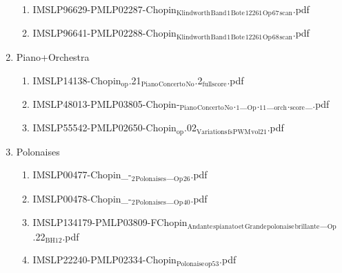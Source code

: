 \documentclass[11pt]{article}
\begin{document}
\begin{enumerate}
\begin{enumerate}
\item IMSLP96629-PMLP02287-Chopin$_{\text{Klindworth}}$$_{\text{Band}}$$_{\text{1}}$$_{\text{Bote}}$$_{\text{12261}}$$_{\text{Op}}$$_{\text{67}}$$_{\text{scan}}$.pdf
\label{sec-1-1-1-1-44-21-3-15}

\item IMSLP96641-PMLP02288-Chopin$_{\text{Klindworth}}$$_{\text{Band}}$$_{\text{1}}$$_{\text{Bote}}$$_{\text{12261}}$$_{\text{Op}}$$_{\text{68}}$$_{\text{scan}}$.pdf
\label{sec-1-1-1-1-44-21-3-16}
\end{enumerate}

\item Piano+Orchestra
\label{sec-1-1-1-1-44-21-4}
\begin{enumerate}
\item IMSLP14138-Chopin$_{\text{op}}$.21$_{\text{Piano}}$$_{\text{Concerto}}$$_{\text{No}}$.2$_{\text{fullscore}}$.pdf
\label{sec-1-1-1-1-44-21-4-1}

\item IMSLP48013-PMLP03805-Chopin-$_{\text{Piano}}$$_{\text{Concerto}}$$_{\text{No}}$.$_{\text{1}}$\_$_{\text{Op}}$.$_{\text{11}}$\_$_{\text{orch}}$.$_{\text{score}}$\_.pdf
\label{sec-1-1-1-1-44-21-4-2}

\item IMSLP55542-PMLP02650-Chopin$_{\text{op}}$.02$_{\text{Variations}}$$_{\text{fs}}$$_{\text{PWM}}$$_{\text{vol21}}$.pdf
\label{sec-1-1-1-1-44-21-4-3}
\end{enumerate}

\item Polonaises
\label{sec-1-1-1-1-44-21-5}
\begin{enumerate}
\item IMSLP00477-Chopin\_-$_{\text{2}}$$_{\text{Polonaises}}$\_$_{\text{Op}}$$_{\text{26}}$.pdf
\label{sec-1-1-1-1-44-21-5-1}

\item IMSLP00478-Chopin\_-$_{\text{2}}$$_{\text{Polonaises}}$\_$_{\text{Op}}$$_{\text{40}}$.pdf
\label{sec-1-1-1-1-44-21-5-2}

\item IMSLP134179-PMLP03809-FChopin$_{\text{Andante}}$$_{\text{spianato}}$$_{\text{et}}$$_{\text{Grande}}$$_{\text{polonaise}}$$_{\text{brillante}}$\_$_{\text{Op}}$.22$_{\text{BH12}}$.pdf
\label{sec-1-1-1-1-44-21-5-3}

\item IMSLP22240-PMLP02334-Chopin$_{\text{Polonaise}}$$_{\text{op53}}$.pdf
\label{sec-1-1-1-1-44-21-5-4}
\end{enumerate}


\end{enumerate}
\end{document}
